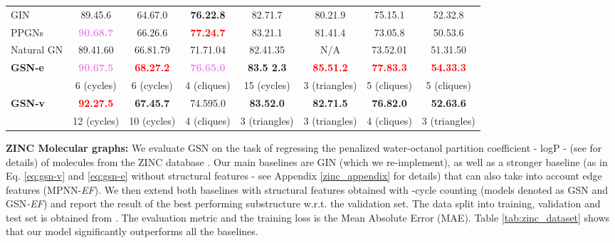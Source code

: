 \documentclass{article} \usepackage{iclr2021_conference,times}
\begin{document}
\begin{table}[h]
{\begin{tabular}{l|cccc ccc}
        GIN \citep{xu2018how} & 
        89.45.6 & 
        64.67.0	& 
        \textbf{76.22.8} &
        82.71.7 &
        80.21.9 & 
        75.15.1 &
        52.32.8\\
        

        
        PPGNs \citep{maron2019provably} &
        \textbf{\textcolor{violet}{90.68.7}} &
        66.26.6 &
        \textbf{\textcolor{red}{77.24.7}} & 
        83.21.1 & 
        81.41.4 &
        73.05.8 & 
        50.53.6\\

        
        Natural GN \citep{de2020natural} &
        89.41.60 &
        66.81.79 &
        71.71.04 &
        82.41.35 &
        N/A &
        73.52.01 &
        51.31.50 \\
        
        
            
        \hline
        {\bf GSN-e} & \textbf{\textcolor{violet}{90.67.5}}  &
        \textbf{\textcolor{red}{68.27.2}}& 
        \textbf{\textcolor{violet}{76.65.0 }} & 
        \textbf{83.5 2.3}&
        \textbf{\textcolor{red}{85.51.2}} &
        \textbf{\textcolor{red}{77.83.3}} & 
        \textbf{\textcolor{red}{54.33.3}}\\
         &  6 (cycles) 
         & 6 (cycles)  
         & 4 (cliques)
         & 15 (cycles) 
         & 3 (triangles)
         & 5 (cliques)  
         & 5 (cliques)   \\
        \hline
        {\bf GSN-v}  &
        \textbf{\textcolor{red}{92.27.5}} & 
        \textbf{67.45.7} & 
        74.595.0 &
        \textbf{ 83.52.0} &
        \textbf{82.71.5}  &
        \textbf{{76.82.0}}& 
        \textbf{52.63.6}\\
            &  12 (cycles) 
            &  10 (cycles) 
            &  4 (cliques)
            & 3 (triangles) 
            & 3 (triangles)
            &   4 (cliques) 
            &   3 (triangles) \\
\end{tabular}
    }
\end{table}


\noindent\textbf{ZINC Molecular graphs:} We evaluate GSN on the task of regressing the penalized water-octanol
partition coefficient - logP - (see \cite{gomez2018automatic, DBLP:conf/icml/KusnerPH17, DBLP:conf/icml/JinBJ18} for details) of molecules from the ZINC database \citep{DBLP:journals/jcisd/IrwinSMBC12, dwivedi2020benchmarking}. Our main baselines are GIN (which we re-implement), as well as a stronger baseline (as in Eq. \ref{eq:gsn-v} and \ref{eq:gsn-e} without structural features - see Appendix \ref{zinc_appendix} for details) that can also take into account edge features (MPNN-\textit{EF}). We then extend both baselines with structural features obtained with -cycle counting (models denoted as GSN and GSN\textit{-EF}) and report the result of the best performing substructure w.r.t. the validation set. The data split into training, validation and test set is obtained from \cite{dwivedi2020benchmarking}. The evaluation metric and the training loss is the Mean Absolute Error (MAE). Table \ref{tab:zinc_dataset} shows that our model significantly outperforms all the baselines. 
\end{document}
